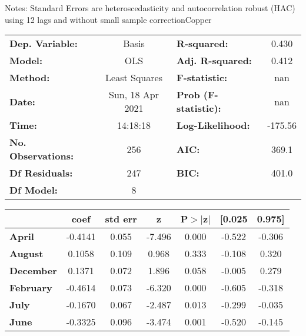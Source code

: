 Notes: \newline
 [1] Standard Errors are heteroscedasticity and autocorrelation robust (HAC) using 12 lags and without small sample correctionCopper\begin{center}
\begin{tabular}{lclc}
\toprule
\textbf{Dep. Variable:}    &      Basis       & \textbf{  R-squared:         } &     0.430   \\
\textbf{Model:}            &       OLS        & \textbf{  Adj. R-squared:    } &     0.412   \\
\textbf{Method:}           &  Least Squares   & \textbf{  F-statistic:       } &       nan   \\
\textbf{Date:}             & Sun, 18 Apr 2021 & \textbf{  Prob (F-statistic):} &      nan    \\
\textbf{Time:}             &     14:18:18     & \textbf{  Log-Likelihood:    } &   -175.56   \\
\textbf{No. Observations:} &         256      & \textbf{  AIC:               } &     369.1   \\
\textbf{Df Residuals:}     &         247      & \textbf{  BIC:               } &     401.0   \\
\textbf{Df Model:}         &           8      & \textbf{                     } &             \\
\bottomrule
\end{tabular}
\begin{tabular}{lcccccc}
                  & \textbf{coef} & \textbf{std err} & \textbf{z} & \textbf{P$> |$z$|$} & \textbf{[0.025} & \textbf{0.975]}  \\
\midrule
\textbf{April}    &      -0.4141  &        0.055     &    -7.496  &         0.000        &       -0.522    &       -0.306     \\
\textbf{August}   &       0.1058  &        0.109     &     0.968  &         0.333        &       -0.108    &        0.320     \\
\textbf{December} &       0.1371  &        0.072     &     1.896  &         0.058        &       -0.005    &        0.279     \\
\textbf{February} &      -0.4614  &        0.073     &    -6.320  &         0.000        &       -0.605    &       -0.318     \\
\textbf{July}     &      -0.1670  &        0.067     &    -2.487  &         0.013        &       -0.299    &       -0.035     \\
\textbf{June}     &      -0.3325  &        0.096     &    -3.474  &         0.001        &       -0.520    &       -0.145     \\

\end{tabular}
\end{center}
